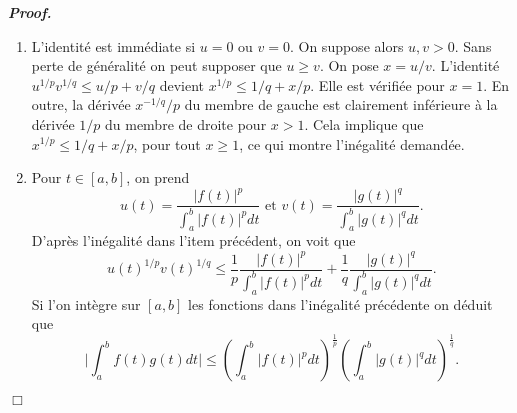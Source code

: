 \documentclass[11pt,a4paper]{article}
\newenvironment{preuve}[1][]
{\vskip 2mm  \noindent\emph{\bf Proof#1. }}{$\Box$ \vskip 2mm}
\let\geq\geqslant
\let\leq\leqslant
\begin{document}
	\begin{preuve}
		\begin{enumerate}
			\item L'identité est immédiate si $u=0$ ou $v=0$. 
			On suppose alors $u, v >0$. 
			Sans perte de généralité on peut supposer que $u \geq v$.  
			On pose $x = u/v$. 
			L'identité $u^{1/p} v^{1/q} \leq u/p+v/q$ devient $x^{1/p} \leq 1/q + x/p$. 
			Elle est vérifiée pour $x =1$. 
			En outre, la dérivée $x^{-1/q}/p$ du membre de gauche est clairement inférieure à la dérivée $1/p$ du membre de droite pour $x >1$. 
			Cela implique que  $x^{1/p} \leq 1/q + x/p$, pour tout $x \geq 1$, ce qui montre l'inégalité demandée. 
			
			\item Pour $t \in [a,b]$, on prend 
			\[     u(t) = \frac{|f(t)|^{p}}{\int_a^b|f(t)|^p dt} \text{ et } v(t) = \frac{|g(t)|^{q}}{\int_a^b|g(t)|^q dt}.     \]
			D'après l'inégalité dans l'item précédent, on voit que 
			\[     u(t)^{1/p} v(t)^{1/q} \leq \frac{1}{p} \frac{|f(t)|^{p}}{\int_a^b|f(t)|^p dt} + \frac{1}{q} \frac{|g(t)|^{q}}{\int_a^b|g(t)|^q dt}.     \]
			Si l'on intègre sur $[a,b]$ les fonctions dans l'inégalité précédente on déduit que 
			\[     \bigg|\int_a^bf(t)g(t)dt\bigg|\leq\left( \int_a^b|f(t)|^pdt\right)^{\frac{1}{p}} \left( \int_a^b|g(t)|^qdt\right)^{\frac{1}{q}}.     \]
		\end{enumerate}
	\end{preuve}
	
\end{document}
